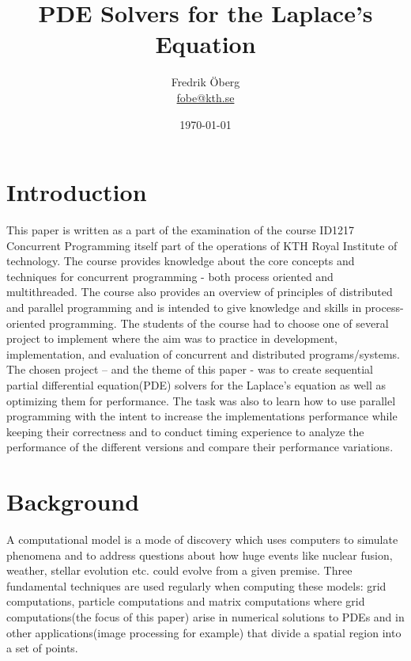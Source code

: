 \documentclass{article}
\begin{document}
\title{PDE Solvers for the Laplace's Equation}
\author{Fredrik Öberg \\ \href{mailto:fobe@kth.se}{fobe@kth.se}}
\date{\today}
\maketitle


\newpage
\tableofcontents
\newpage

\section{Introduction}
This paper is written as a part of the examination of the course ID1217 Concurrent Programming 
itself part of the operations of KTH Royal Institute of technology. The course provides knowledge about the core concepts and techniques for concurrent programming - both process oriented and multithreaded. The course also provides an overview of principles of distributed and parallel programming and is intended to give knowledge and skills in process-oriented programming. 
The students of the course had to choose one of several project to implement where the aim was to practice in development, implementation, and evaluation of concurrent and distributed programs/systems. The chosen project – and the theme of this paper - was to create sequential partial differential equation(PDE) solvers for the Laplace’s equation as well as optimizing them for performance. The task was also to learn how to use parallel programming with the intent to increase the implementations performance while keeping their correctness and to conduct timing experience to analyze the performance of the different versions and compare their performance variations.

\section{Background}\label{programs}

A computational model is a mode of discovery which uses computers to simulate phenomena and to address questions about how huge events like nuclear fusion, weather, stellar evolution etc. could evolve from a given premise. Three fundamental techniques are used regularly when computing these models: grid computations, particle computations and matrix computations where grid computations(the focus of this paper) arise in numerical solutions to PDEs and in other applications(image processing for example) that divide a spatial region into a set of points. 
\end{document}
